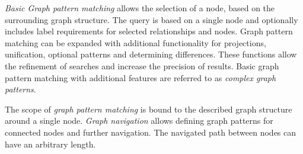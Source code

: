 \emph{Basic Graph pattern matching} allows the selection of a node, based on the surrounding graph structure. The query is based on a single node and optionally includes label requirements for selected relationships and nodes. Graph pattern matching can be expanded with additional functionality for projections, unification, optional patterns and determining differences. These functions allow the refinement of searches and increase the precision of results. Basic graph pattern matching with additional features are referred to as \emph{complex graph patterns}. \cite[p.~8,~9]{angles2017}


The scope of \emph{graph pattern matching} is bound to the described graph structure around a single node. \emph{Graph navigation} allows defining graph patterns for connected nodes and further navigation. The navigated path between nodes can have an arbitrary length. \cite[p.~21,~22]{angles2017} 

